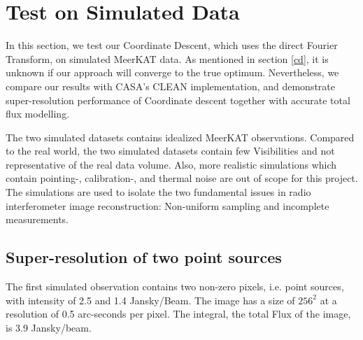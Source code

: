 \section{Test on Simulated Data}\label{results}
In this section, we test our Coordinate Descent, which uses the direct Fourier Transform, on simulated MeerKAT data. As mentioned in section \ref{cd}, it is unknown if our approach will converge to the true optimum. Nevertheless, we compare our results with CASA's CLEAN implementation, and demonstrate super-resolution performance of Coordinate descent together with accurate total flux modelling.

The two simulated datasets contains idealized MeerKAT observations. Compared to the real world, the two simulated datasets contain few Visibilities and not representative of the real data volume. Also, more realistic simulations which contain pointing-, calibration-, and thermal noise are out of scope for this project. The simulations are used to isolate the two fundamental issues in radio interferometer image reconstruction: Non-uniform sampling and incomplete measurements.

\subsection{Super-resolution of two point sources}
The first simulated observation contains two non-zero pixels, i.e. point sources, with intensity of 2.5 and 1.4 Jansky/Beam. The image has a size of $256^2$ at a resolution of 0.5 arc-seconds per pixel. The integral, the total Flux of the image, is 3.9 Jansky/beam.


